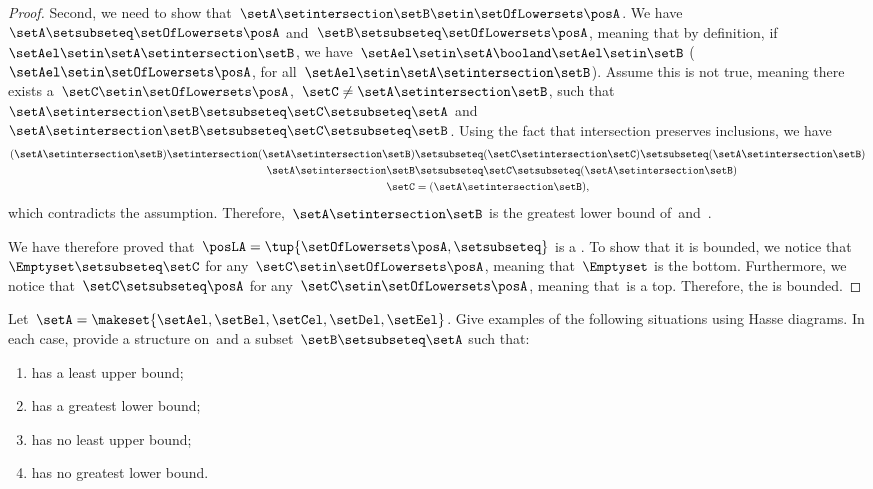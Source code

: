 \begin{proof}
    Second, we need to show that~$\setA \setintersection \setB\setin \setOfLowersets \posA$.
    We have~$\setA \setsubseteq \setOfLowersets \posA$ and~$\setB\setsubseteq \setOfLowersets \posA$, meaning that by definition, if~$\setAel\setin \setA\setintersection \setB$, we have~$\setAel \setin \setA\booland \setAel\setin \setB$ ($\setAel\setin \setOfLowersets \posA$, for all~$\setAel\setin \setA \setintersection \setB$).
    Assume this is not true, meaning there exists a~$\setC\setin \setOfLowersets \posA$,~$\setC\neq \setA\setintersection \setB$, such that~$\setA\setintersection \setB\setsubseteq \setC\setsubseteq \setA$ and~$\setA\setintersection \setB\setsubseteq \setC\setsubseteq \setB$.
    Using the fact that intersection preserves inclusions, we have
    \begin{equation}
        \begin{aligned}
            (\setA\setintersection \setB)
            \setintersection (\setA\setintersection \setB) & \setsubseteq (\setC \setintersection \setC) \setsubseteq (\setA\setintersection \setB) \\
            \setA\setintersection \setB                    & \setsubseteq \setC\setsubseteq (\setA\setintersection \setB) \\
            \setC                                          & =(\setA\setintersection \setB),
        \end{aligned}
    \end{equation}
    which contradicts the assumption.
    Therefore,~$\setA\setintersection \setB$ is the greatest lower bound of~\setA and~\setB.

    We have therefore proved that~$\posLA=\tup{\setOfLowersets \posA, \setsubseteq}$ is a .
    To show that it is bounded, we notice that~$\Emptyset \setsubseteq \setC$ for any~$\setC\setin \setOfLowersets \posA$, meaning that~$\Emptyset$ is the bottom.
    Furthermore, we notice that~$\setC\setsubseteq \posA$ for any~$\setC\setin \setOfLowersets \posA$, meaning that~\posA is a top.
    Therefore, the  is bounded.
\end{proof}

\vfill

\begin{gradedexercise}
    \label{ex:UpperLowerBounds}
    Let~$\setA = \makeset{\setAel, \setBel, \setCel, \setDel, \setEel }$.
    Give examples of the following situations using Hasse diagrams.
    In each case, provide a  structure on~\setA and a subset~$\setB \setsubseteq \setA$ such that:
    \begin{enumerate}
        \item \setB has a least upper bound;
        \item \setB has a greatest lower bound;
        \item \setB has no least upper bound;
        \item \setB has no greatest lower bound.
    \end{enumerate}
\end{gradedexercise}

